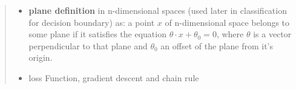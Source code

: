 \documentclass[]{article}
\providecommand{\tightlist}{%
  \setlength{\itemsep}{0pt}\setlength{\parskip}{0pt}}
\begin{document}
\begin{quote}
\begin{itemize}
\tightlist
\item
  \textbf{plane definition} in n-dimensional spaces (used later in
  classification for decision boundary) as: a point \(x\) of
  n-dimensional space belongs to some plane if it satisfies the equation
  \(\theta \cdot x + \theta_{0} = 0\), where \(\theta\) is a vector
  perpendicular to that plane and \(\theta_{0}\) an offset of the plane
  from it's origin.
\item
  loss Function, gradient descent and chain rule
\end{itemize}
\end{quote}
\end{document}
